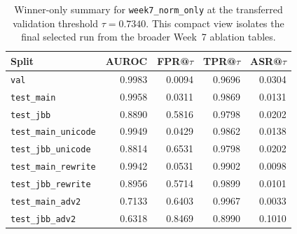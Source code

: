 \begin{table}[t]
\centering
\caption{Winner-only summary for \texttt{week7\_norm\_only} at the transferred validation threshold $\tau = 0.7340$. This compact view isolates the final selected run from the broader Week~7 ablation tables.}
\label{tab:winner_summary}
\small
\begin{tabular}{lrrrr}
\toprule
Split & AUROC & FPR@$\tau$ & TPR@$\tau$ & ASR@$\tau$ \\
\midrule
\texttt{val} & 0.9983 & 0.0094 & 0.9696 & 0.0304 \\
\texttt{test\_main} & 0.9958 & 0.0311 & 0.9869 & 0.0131 \\
\texttt{test\_jbb} & 0.8890 & 0.5816 & 0.9798 & 0.0202 \\
\midrule
\texttt{test\_main\_unicode} & 0.9949 & 0.0429 & 0.9862 & 0.0138 \\
\texttt{test\_jbb\_unicode} & 0.8814 & 0.6531 & 0.9798 & 0.0202 \\
\midrule
\texttt{test\_main\_rewrite} & 0.9942 & 0.0531 & 0.9902 & 0.0098 \\
\texttt{test\_jbb\_rewrite} & 0.8956 & 0.5714 & 0.9899 & 0.0101 \\
\midrule
\texttt{test\_main\_adv2} & 0.7133 & 0.6403 & 0.9967 & 0.0033 \\
\texttt{test\_jbb\_adv2} & 0.6318 & 0.8469 & 0.8990 & 0.1010 \\
\bottomrule
\end{tabular}
\normalsize
\end{table}
